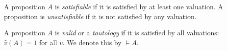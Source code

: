 \begin{dfn}
A proposition $A$ is \emph{satisfiable} if it is satisfied by at least one valuation.
A proposition is \emph{unsatisfiable} if it is not satisfied by any valuation.

A proposition $A$ is \emph{valid} or a \emph{tautology} if it is satisfied by all valuations: $\hat{v}(A) = 1$ for all $v$.
We denote this by $\vDash A$.
\end{dfn}